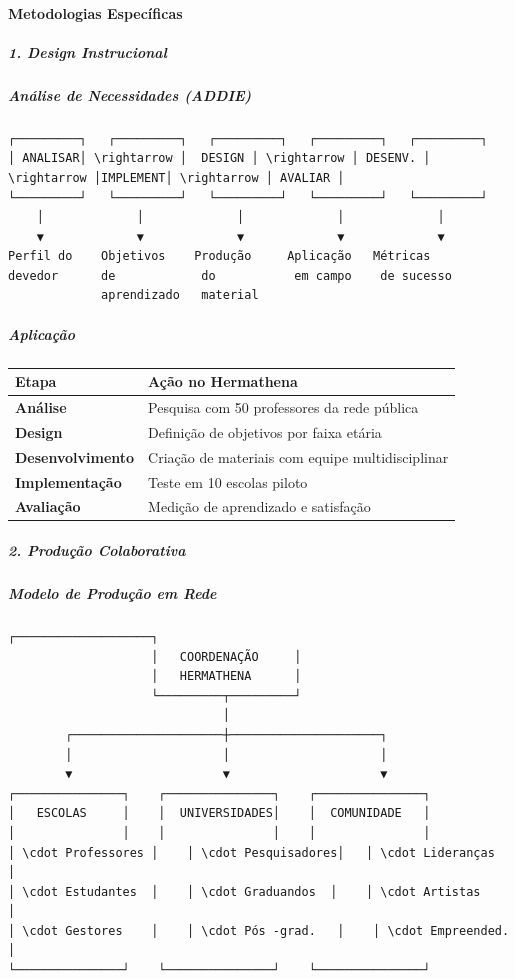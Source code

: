 \paragraph{Metodologias Específicas}

\subparagraph{1. Design Instrucional}

\subparagraph{Análise de Necessidades (ADDIE)}

\begin{verbatim}
┌─────────┐   ┌─────────┐   ┌─────────┐   ┌─────────┐   ┌─────────┐
│ ANALISAR│ \rightarrow │  DESIGN │ \rightarrow │ DESENV. │ \rightarrow │IMPLEMENT│ \rightarrow │ AVALIAR │
└─────────┘   └─────────┘   └─────────┘   └─────────┘   └─────────┘
    │             │             │             │             │
    ▼             ▼             ▼             ▼             ▼
Perfil do    Objetivos    Produção     Aplicação   Métricas
devedor      de            do           em campo    de sucesso
             aprendizado   material
\end{verbatim}

\subparagraph{Aplicação}

\bigskip\noindent
\begin{tabular}{p{}p{}}
\toprule
Etapa & Ação no Hermathena \\
\hline
\textbf{Análise} & Pesquisa com 50 professores da rede pública \\
\textbf{Design} & Definição de objetivos por faixa etária \\
\textbf{Desenvolvimento} & Criação de materiais com equipe multidisciplinar \\
\textbf{Implementação} & Teste em 10 escolas piloto \\
\textbf{Avaliação} & Medição de aprendizado e satisfação \\
\bottomrule
\end{tabular}

\bigskip

\subparagraph{2. Produção Colaborativa}

\subparagraph{Modelo de Produção em Rede}

\begin{verbatim}
┌───────────────────┐
                    │   COORDENAÇÃO     │
                    │   HERMATHENA      │
                    └─────────┬─────────┘
                              │
        ┌─────────────────────┼─────────────────────┐
        │                     │                     │
        ▼                     ▼                     ▼
┌───────────────┐    ┌───────────────┐    ┌───────────────┐
│   ESCOLAS     │    │  UNIVERSIDADES│    │  COMUNIDADE   │
│               │    │               │    │               │
│ \cdot Professores │    │ \cdot Pesquisadores│   │ \cdot Lideranças  │
│ \cdot Estudantes  │    │ \cdot Graduandos  │    │ \cdot Artistas    │
│ \cdot Gestores    │    │ \cdot Pós -grad.   │    │ \cdot Empreended. │
└───────────────┘    └───────────────┘    └───────────────┘
\end{verbatim}

